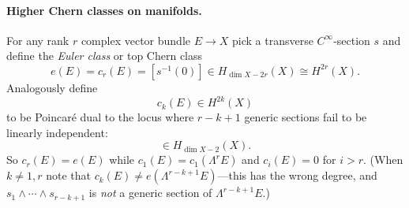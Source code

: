 \documentclass{article}
\theoremstyle{definition}
\begin{document}
\paragraph{Higher Chern classes on manifolds.}
For any rank $r$ complex vector bundle $E\to X$ pick a transverse
$C^\infty$-section $s$ and define the \emph{Euler class} or top Chern class
\begin{equation*}
    e(E) = c_r(E) = [s^{-1}(0)] \in H_{\dim X-2r}(X) \cong H^{2r}(X).
\end{equation*}
Analogously define
\begin{equation*}
    c_k(E) \in H^{2k}(X)
\end{equation*}
to be Poincar\'e dual to the locus where $r-k+1$ generic sections fail to be
linearly independent:
\begin{equation*}
    [(s_1\wedge\cdots\wedge s_{r-k+1})^{-1}(0)] \in H_{\dim X-2}(X).
\end{equation*}
So $c_r(E)=e(E)$ while $c_1(E)=c_1(\Lambda^rE)$ and $c_i(E)=0$ for $i>r$.
(When $k\ne1,r$ note that $c_k(E)\ne e(\Lambda^{r-k+1}E)$---this has the wrong
degree, and $s_1\wedge\cdots\wedge s_{r-k+1}$ is \emph{not} a generic section of
$\Lambda^{r-k+1}E$.)
\end{document}

